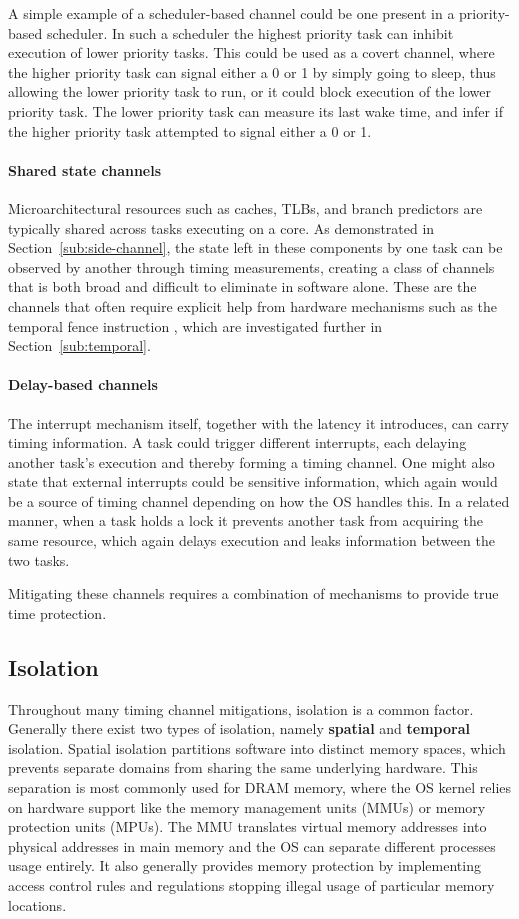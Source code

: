 A simple example of a scheduler-based channel could be one present in a
priority-based scheduler. In such a scheduler the highest priority task can
inhibit execution of lower priority tasks. This could be used as a covert
channel, where the higher priority task can signal either a 0 or 1 by simply
going to sleep, thus allowing the lower priority task to run, or it could block
execution of the lower priority task. The lower priority task can measure its
last wake time, and infer if the higher priority task attempted to signal
either a 0 or 1.

\paragraph{Shared state channels}
Microarchitectural resources such as caches, TLBs, and branch predictors are
typically shared across tasks executing on a core. As demonstrated in
Section~\ref{sub:side-channel}, the state left in these components by one task
can be observed by another through timing measurements, creating a class of
channels that is both broad and difficult to eliminate in software alone. These
are the channels that often require explicit help from hardware mechanisms such
as the temporal fence instruction \cite{wistoff2023, wistoff2025}, which are
investigated further in Section~\ref{sub:temporal}.

\paragraph{Delay-based channels}
The interrupt mechanism itself, together with the latency it introduces, can
carry timing information. A task could trigger different interrupts, each
delaying another task's execution and thereby forming a timing channel. One
might also state that external interrupts could be sensitive information, which
again would be a source of timing channel depending on how the OS handles this.
In a related manner, when a task holds a lock it prevents another task from
acquiring the same resource, which again delays execution and leaks information
between the two tasks.

Mitigating these channels requires a combination of mechanisms to provide true
time protection.

\subsection{Isolation}\label{sub:isolation}
Throughout many timing channel mitigations, isolation is a common factor.
Generally there exist two types of isolation, namely \textbf{spatial} and
\textbf{temporal} isolation. Spatial isolation partitions software into
distinct memory spaces, which prevents separate domains from sharing the same
underlying hardware. This separation is most commonly used for DRAM memory,
where the OS kernel relies on hardware support like the memory management units
(MMUs) or memory protection units (MPUs). The MMU translates virtual memory
addresses into physical addresses in main memory and the OS can separate
different processes usage entirely. It also generally provides memory
protection by implementing access control rules and regulations stopping
illegal usage of particular memory locations. 

